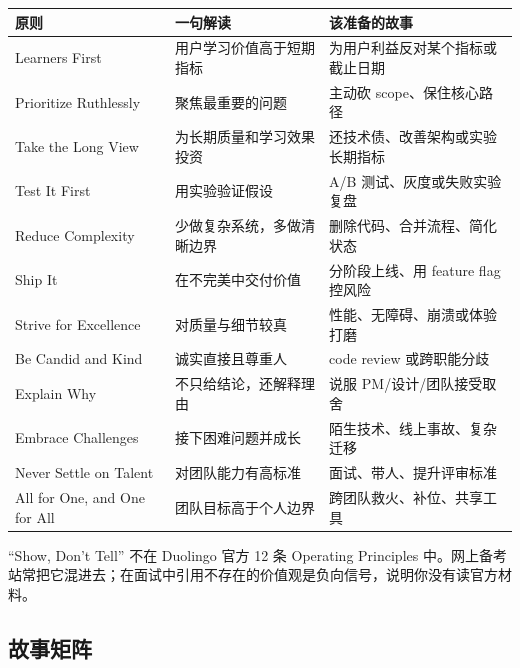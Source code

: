 \begin{center}
\begin{tabularx}{\linewidth}{@{}l X X@{}}
\toprule
\textbf{原则} & \textbf{一句解读} & \textbf{该准备的故事} \\
\midrule
Learners First & 用户学习价值高于短期指标 & 为用户利益反对某个指标或截止日期 \\
Prioritize Ruthlessly & 聚焦最重要的问题 & 主动砍 scope、保住核心路径 \\
Take the Long View & 为长期质量和学习效果投资 & 还技术债、改善架构或实验长期指标 \\
Test It First & 用实验验证假设 & A/B 测试、灰度或失败实验复盘 \\
Reduce Complexity & 少做复杂系统，多做清晰边界 & 删除代码、合并流程、简化状态 \\
Ship It & 在不完美中交付价值 & 分阶段上线、用 feature flag 控风险 \\
Strive for Excellence & 对质量与细节较真 & 性能、无障碍、崩溃或体验打磨 \\
Be Candid and Kind & 诚实直接且尊重人 & code review 或跨职能分歧 \\
Explain Why & 不只给结论，还解释理由 & 说服 PM/设计/团队接受取舍 \\
Embrace Challenges & 接下困难问题并成长 & 陌生技术、线上事故、复杂迁移 \\
Never Settle on Talent & 对团队能力有高标准 & 面试、带人、提升评审标准 \\
All for One, and One for All & 团队目标高于个人边界 & 跨团队救火、补位、共享工具 \\
\bottomrule
\end{tabularx}
\end{center}

\begin{pitfall}[不要引用不存在的价值观]
\srcofficial “Show, Don't Tell” 不在 Duolingo 官方 12 条 Operating Principles 中。网上备考站常把它混进去；在面试中引用不存在的价值观是负向信号，说明你没有读官方材料。
\end{pitfall}

\subsection{故事矩阵}

